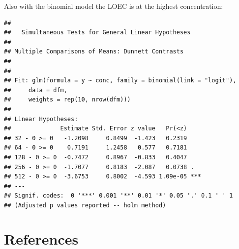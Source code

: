 Also with the binomial model the LOEC is at the highest concentration:
\begin{knitrout}
\color{fgcolor}\small\begin{kframe}
\begin{alltt}
\hlstd{(}  \hlstd{=} \hlstd{(} \hlstd{=} \hlstd{),} 
                     \hlstd{=} \hlstd{),}
                     \hlstd{=} \hlstd{(}\hlstd{))}
\end{alltt}
\begin{verbatim}
## 
## 	 Simultaneous Tests for General Linear Hypotheses
## 
## Multiple Comparisons of Means: Dunnett Contrasts
## 
## 
## Fit: glm(formula = y ~ conc, family = binomial(link = "logit"), 
##     data = dfm, 
##     weights = rep(10, nrow(dfm)))
## 
## Linear Hypotheses:
##              Estimate Std. Error z value   Pr(<z)    
## 32 - 0 >= 0   -1.2098     0.8499  -1.423   0.2319    
## 64 - 0 >= 0    0.7191     1.2458   0.577   0.7181    
## 128 - 0 >= 0  -0.7472     0.8967  -0.833   0.4047    
## 256 - 0 >= 0  -1.7077     0.8183  -2.087   0.0738 .  
## 512 - 0 >= 0  -3.6753     0.8002  -4.593 1.09e-05 ***
## ---
## Signif. codes:  0 '***' 0.001 '**' 0.01 '*' 0.05 '.' 0.1 ' ' 1
## (Adjusted p values reported -- holm method)
\end{verbatim}
\end{kframe}
\end{knitrout}


\clearpage
\section{References}
\printbibliography[heading=none]

